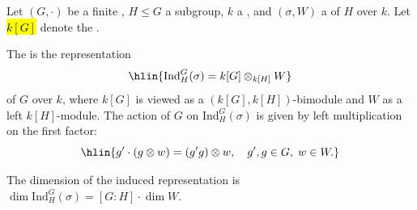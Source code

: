 \begin{definition} \label{definition:induced_representation_of_a_finite_group_from_a_subgroup_over_a_field}

    Let $(G, \cdot)$ be a finite , $H \leq G$ a subgroup, $k$ a , and $(\sigma, W)$ a  of $H$ over $k$. Let \hl{$k[G]$} denote the .

    The  is the representation
    $$\hlin{\mathrm{Ind}_H^G(\sigma) = k[G] \otimes_{k[H]} W}$$
    of $G$ over $k$, where $k[G]$ is viewed as a $(k[G], k[H])$-bimodule and $W$ as a left $k[H]$-module. The action of $G$ on $\mathrm{Ind}_H^G(\sigma)$ is given by left multiplication on the first factor:
    $$\hlin{g' \cdot (g \otimes w) = (g'g) \otimes w, \quad g', g \in G, \; w \in W.}$$

    The dimension of the induced representation is $\dim \mathrm{Ind}_H^G(\sigma) = [G\!:\!H] \cdot \dim W$.
\end{definition}
